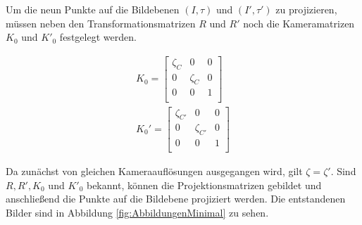 %


Um die neun Punkte auf die Bildebenen $(I,\tau)$ und $(I',\tau')$ zu projizieren, müssen neben den Transformationsmatrizen $R$ und $R'$ noch die Kameramatrizen $K_0$ und $K'_0$ festgelegt werden.


\begin{gather}		
K_0 =
\begin{bmatrix}
\zeta_{C}&0&0\\
0&\zeta_{C}&0\\
0&0&1\\
\end{bmatrix}\label{eq:eq4.9}\\
K_0' =
\begin{bmatrix}
\zeta_{C'}&0&0\\
0&\zeta_{C'}&0\\
0&0&1\\
\end{bmatrix}\label{eq:eq4.10}
\end{gather}

Da zunächst von gleichen Kameraauflösungen ausgegangen wird, gilt $\zeta = \zeta'$. Sind $R,R',K_0$ und $K'_0$ bekannt, können die Projektionsmatrizen gebildet und anschließend die Punkte auf die Bildebene projiziert werden. Die entstandenen Bilder sind in Abbildung \ref{fig:AbbildungenMinimal} zu sehen.  



